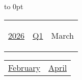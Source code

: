 \vbox to 0pt{}


\pagebreak
{\noindent\Large\renewcommand{\arraystretch}{\myNumArrayStretch}\begin{tabular}{|l|l|l}
\hyperlink{2026}{2026} & \hyperlink{Q1}{Q1} & \hypertarget{March}{March}
\end{tabular}\hfill%
\begin{tabular}{r|r@{}}
\hyperlink{February}{February} & \hyperlink{April}{April}
\end{tabular}}
\myLineThick\medskip

{%

\setlength{\tabcolsep}{\myLenTabColSep}%
%
\begin{tabularx}{\linewidth}{|l!{\vrule width \myLenLineThicknessThick}*{7}{@{}X@{}|}}
  

\end{tabularx}}
